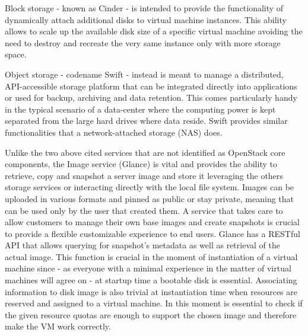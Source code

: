 Block storage - known as Cinder - is intended to provide the functionality of dynamically attach additional disks to virtual machine instances. This ability allows to scale up the available disk size of a specific virtual machine avoiding the need to destroy and recreate the very same instance only with more storage space.

Object storage - codename Swift - instead is meant to manage a distributed, API-accessible storage platform that can be integrated directly into applications or used for backup, archiving and data retention. This comes particularly handy in the typical scenario of a data-center where the computing power is kept separated from the large hard drives where data reside. Swift provides similar functionalities that a network-attached storage (NAS) does.

Unlike the two above cited services that are not identified as OpenStack core components, the Image service (Glance) is vital and provides the ability to retrieve, copy and snapshot a server image and store it leveraging the others storage services or interacting directly with the local file system.
Images can be uploaded in various formats and pinned as public or stay private, meaning that can be used only by the user that created them.
A service that takes care to allow customers to manage their own base images and create snapshots is crucial to provide a flexible customizable experience to end users.
Glance has a RESTful API that allows querying for snapshot's metadata as well as retrieval of the actual image.
This function is crucial in the moment of instantiation of a virtual machine since - as everyone with a minimal experience in the matter of virtual machines will agree on - at startup time a bootable disk is essential.
Associating information to disk image is also trivial at instantiation time when resources are reserved and assigned to a virtual machine. In this moment is essential to check if the given resource quotas are enough to support the chosen image and therefore make the VM work correctly.
